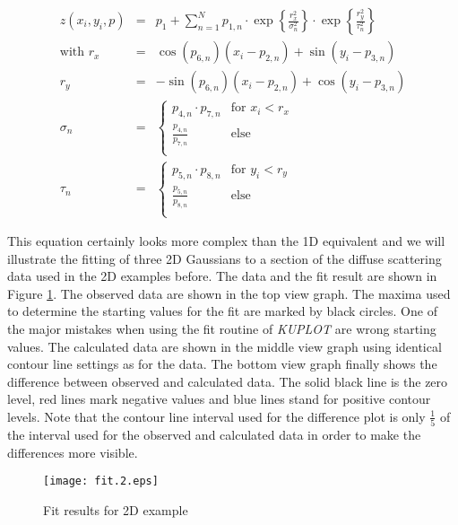 \begin{eqnarray}
    z(x_{i},y_{i},p) & = & p_{1} +
                   \sum_{n=1}^{N} p_{1,n} \cdot
                   \exp\left\{\frac {r_{x}^{2}}{\sigma_{n}^{2}}\right\}
              \cdot\exp\left\{\frac {r_{y}^{2}}{\tau_{n}^{2}}  \right\}
    \label{fit-2d-eq1}\\
    \mbox {with\ }
         r_{x} & = & \cos(p_{6,n})(x_{i}-p_{2,n}) + \sin(y_{i}-p_{3,n})
    \nonumber \\
         r_{y} & = &-\sin(p_{6,n})(x_{i}-p_{2,n}) + \cos(y_{i}-p_{3,n})
    \nonumber \\
         \sigma_{n} & = & \left\{ \begin{array}{ll}
                  p_{4,n} \cdot p_{7,n} & \mbox {for $x_{i} < r_{x}$}\\
                \frac{p_{4,n}}{p_{7,n}} & \mbox {else} \\ \end{array}\right.
    \nonumber \\
         \tau_{n} & = & \left\{ \begin{array}{ll}
                  p_{5,n} \cdot p_{8,n} & \mbox {for $y_{i} < r_{y}$}\\
                \frac{p_{5,n}}{p_{8,n}} & \mbox {else} \\ \end{array}\right.
    \nonumber
\end{eqnarray}

This equation certainly looks more complex than the 1D equivalent and we
will illustrate the fitting of three 2D Gaussians to a section of the
diffuse scattering data used in the 2D examples before.  The data and the
fit result are shown in Figure \ref{fit-fig2}.  The observed data are shown
in the top view graph.  The maxima used to determine the starting values
for the fit are marked by black circles.  One of the major mistakes when
using the fit routine of {\it KUPLOT} are wrong starting values. The
calculated data are shown in the middle view graph using identical
contour line settings as for the data. The bottom view graph finally
shows the difference between observed and calculated data. The solid
black line is the zero level, red lines mark negative values and blue
lines stand for positive contour levels. Note that the contour line
interval used for the difference plot is only $\frac{1}{5}$ of the
interval used for the observed and calculated data in order to make
the differences more visible.

\begin{figure}[ptbh]
   \centering
   \texttt{[image: fit.2.eps]}
   \caption{Fit results for 2D example}
   \label{fit-fig2}
\end{figure}

